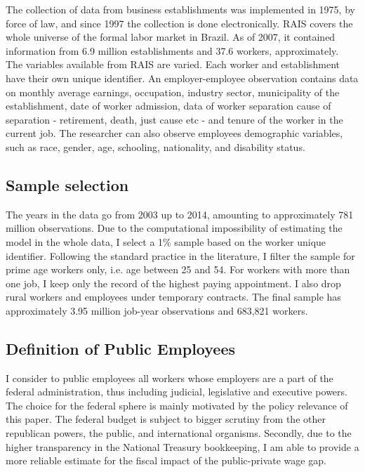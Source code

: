 \documentclass{article}
\begin{document}
\noindent
The collection of data from  business establishments was implemented in 1975, by force of law, and since 1997 the collection is done electronically. RAIS covers the whole universe of the formal labor market in Brazil. As of 2007, it contained information from 6.9 million establishments and 37.6 workers, approximately. \\

\noindent
The variables available from RAIS are varied. Each worker and establishment have their own unique identifier. An employer-employee observation contains data on monthly average earnings, occupation, industry sector, municipality of the establishment, date of worker admission, data of worker separation cause of separation - retirement, death, just cause etc - and tenure of the worker in the current job. The researcher can also observe employees demographic variables, such as race, gender, age, schooling, nationality, and disability status. \\

\subsection{Sample selection}
\noindent
The years in the data go from 2003 up to 2014, amounting to approximately 781 million observations. Due to the computational impossibility of estimating the model in the whole data, I select a 1\% sample based on the worker unique identifier. Following the standard practice in the literature, I filter the sample for prime age workers only, i.e. age between 25 and 54. For workers with more than one job, I keep only the record of the highest paying appointment. I also drop rural workers and employees under temporary contracts. The final sample has approximately 3.95 million job-year observations and 683,821 workers. \\

\subsection{Definition of Public Employees}
\noindent
I consider to public employees all workers whose employers are a part of the federal administration, thus including judicial, legislative and executive powers. The choice for the federal sphere is mainly motivated by the policy relevance of this paper. The federal budget is subject to bigger scrutiny from the other republican powers, the public, and international organisms. Secondly, due to the higher transparency in the National Treasury bookkeeping, I am able to provide a more reliable estimate for the fiscal impact of the public-private wage gap.        
\end{document}
